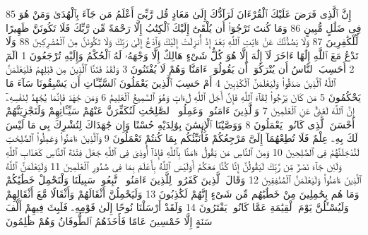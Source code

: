 {\tiny\colorbox{cl_aya}{85}} إِنَّ ٱلَّذِى فَرَضَ عَلَيْكَ ٱلْقُرْءَانَ لَرَآدُّكَ إِلَىٰ مَعَادٍ قُل رَّبِّىٓ أَعْلَمُ مَن جَآءَ بِٱلْهُدَىٰ وَمَنْ هُوَ فِى ضَلَٰلٍ مُّبِينٍ
{\tiny\colorbox{cl_aya}{86}} وَمَا كُنتَ تَرْجُوٓا۟ أَن يُلْقَىٰٓ إِلَيْكَ ٱلْكِتَٰبُ إِلَّا رَحْمَةً مِّن رَّبِّكَ فَلَا تَكُونَنَّ ظَهِيرًا لِّلْكَٰفِرِينَ
{\tiny\colorbox{cl_aya}{87}} وَلَا يَصُدُّنَّكَ عَنْ ءَايَٰتِ ٱللَّهِ بَعْدَ إِذْ أُنزِلَتْ إِلَيْكَ وَٱدْعُ إِلَىٰ رَبِّكَ وَلَا تَكُونَنَّ مِنَ ٱلْمُشْرِكِينَ
{\tiny\colorbox{cl_aya}{88}} وَلَا تَدْعُ مَعَ ٱللَّهِ إِلَٰهًا ءَاخَرَ لَآ إِلَٰهَ إِلَّا هُوَ كُلُّ شَىْءٍ هَالِكٌ إِلَّا وَجْهَهُۥ لَهُ ٱلْحُكْمُ وَإِلَيْهِ تُرْجَعُونَ
{\tiny\colorbox{cl_aya}{1}} الٓمٓ
{\tiny\colorbox{cl_aya}{2}} أَحَسِبَ ٱلنَّاسُ أَن يُتْرَكُوٓا۟ أَن يَقُولُوٓا۟ ءَامَنَّا وَهُمْ لَا يُفْتَنُونَ
{\tiny\colorbox{cl_aya}{3}} وَلَقَدْ فَتَنَّا ٱلَّذِينَ مِن قَبْلِهِمْ فَلَيَعْلَمَنَّ ٱللَّهُ ٱلَّذِينَ صَدَقُوا۟ وَلَيَعْلَمَنَّ ٱلْكَٰذِبِينَ
{\tiny\colorbox{cl_aya}{4}} أَمْ حَسِبَ ٱلَّذِينَ يَعْمَلُونَ ٱلسَّيِّـَٔاتِ أَن يَسْبِقُونَا سَآءَ مَا يَحْكُمُونَ
{\tiny\colorbox{cl_aya}{5}} مَن كَانَ يَرْجُوا۟ لِقَآءَ ٱللَّهِ فَإِنَّ أَجَلَ ٱللَّهِ لَءَاتٍ وَهُوَ ٱلسَّمِيعُ ٱلْعَلِيمُ
{\tiny\colorbox{cl_aya}{6}} وَمَن جَٰهَدَ فَإِنَّمَا يُجَٰهِدُ لِنَفْسِهِۦٓ إِنَّ ٱللَّهَ لَغَنِىٌّ عَنِ ٱلْعَٰلَمِينَ
{\tiny\colorbox{cl_aya}{7}} وَٱلَّذِينَ ءَامَنُوا۟ وَعَمِلُوا۟ ٱلصَّٰلِحَٰتِ لَنُكَفِّرَنَّ عَنْهُمْ سَيِّـَٔاتِهِمْ وَلَنَجْزِيَنَّهُمْ أَحْسَنَ ٱلَّذِى كَانُوا۟ يَعْمَلُونَ
{\tiny\colorbox{cl_aya}{8}} وَوَصَّيْنَا ٱلْإِنسَٰنَ بِوَٰلِدَيْهِ حُسْنًا وَإِن جَٰهَدَاكَ لِتُشْرِكَ بِى مَا لَيْسَ لَكَ بِهِۦ عِلْمٌ فَلَا تُطِعْهُمَآ إِلَىَّ مَرْجِعُكُمْ فَأُنَبِّئُكُم بِمَا كُنتُمْ تَعْمَلُونَ
{\tiny\colorbox{cl_aya}{9}} وَٱلَّذِينَ ءَامَنُوا۟ وَعَمِلُوا۟ ٱلصَّٰلِحَٰتِ لَنُدْخِلَنَّهُمْ فِى ٱلصَّٰلِحِينَ
{\tiny\colorbox{cl_aya}{10}} وَمِنَ ٱلنَّاسِ مَن يَقُولُ ءَامَنَّا بِٱللَّهِ فَإِذَآ أُوذِىَ فِى ٱللَّهِ جَعَلَ فِتْنَةَ ٱلنَّاسِ كَعَذَابِ ٱللَّهِ وَلَئِن جَآءَ نَصْرٌ مِّن رَّبِّكَ لَيَقُولُنَّ إِنَّا كُنَّا مَعَكُمْ أَوَلَيْسَ ٱللَّهُ بِأَعْلَمَ بِمَا فِى صُدُورِ ٱلْعَٰلَمِينَ
{\tiny\colorbox{cl_aya}{11}} وَلَيَعْلَمَنَّ ٱللَّهُ ٱلَّذِينَ ءَامَنُوا۟ وَلَيَعْلَمَنَّ ٱلْمُنَٰفِقِينَ
{\tiny\colorbox{cl_aya}{12}} وَقَالَ ٱلَّذِينَ كَفَرُوا۟ لِلَّذِينَ ءَامَنُوا۟ ٱتَّبِعُوا۟ سَبِيلَنَا وَلْنَحْمِلْ خَطَٰيَٰكُمْ وَمَا هُم بِحَٰمِلِينَ مِنْ خَطَٰيَٰهُم مِّن شَىْءٍ إِنَّهُمْ لَكَٰذِبُونَ
{\tiny\colorbox{cl_aya}{13}} وَلَيَحْمِلُنَّ أَثْقَالَهُمْ وَأَثْقَالًا مَّعَ أَثْقَالِهِمْ وَلَيُسْـَٔلُنَّ يَوْمَ ٱلْقِيَٰمَةِ عَمَّا كَانُوا۟ يَفْتَرُونَ
{\tiny\colorbox{cl_aya}{14}} وَلَقَدْ أَرْسَلْنَا نُوحًا إِلَىٰ قَوْمِهِۦ فَلَبِثَ فِيهِمْ أَلْفَ سَنَةٍ إِلَّا خَمْسِينَ عَامًا فَأَخَذَهُمُ ٱلطُّوفَانُ وَهُمْ ظَٰلِمُونَ

